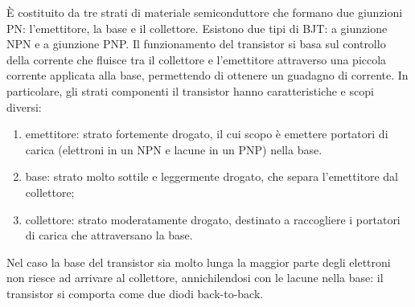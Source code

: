 È costituito da tre strati di materiale semiconduttore che formano due giunzioni PN: l'emettitore, la base e il collettore. Esistono due tipi di BJT: a giunzione NPN e a giunzione PNP. Il funzionamento del transistor si basa sul controllo della corrente che fluisce tra il collettore e l'emettitore attraverso una piccola corrente applicata alla base, permettendo di ottenere un guadagno di corrente. In particolare, gli strati componenti il transistor hanno caratteristiche e scopi diversi:
\begin{enumerate}
    \item emettitore: strato fortemente drogato, il cui scopo è emettere portatori di carica (elettroni in un NPN e lacune in un PNP) nella base.
    \item base: strato molto sottile e leggermente drogato, che separa l'emettitore dal collettore;
    \item collettore: strato moderatamente drogato, destinato a raccogliere i portatori di carica che attraversano la base.
\end{enumerate}
\begin{obs}
    Nel caso la base del transistor sia molto lunga la maggior parte degli elettroni non riesce ad arrivare al collettore, annichilendosi con le lacune nella base: il transistor si comporta come due diodi back-to-back.
\end{obs}

